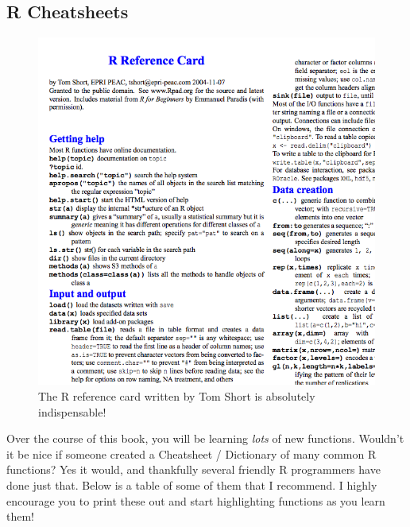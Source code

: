 \documentclass[]{book}
\theoremstyle{definition}
\theoremstyle{definition}
\theoremstyle{remark}
\begin{document}
\subsection{R Cheatsheets}\label{r-cheatsheets}

\begin{figure}

{\centering \includegraphics[width=0.75\linewidth]{images/rreferencess} 

}

\caption{The R reference card written by Tom Short is absolutely indispensable!}\label{fig:rreferencecard}
\end{figure}

Over the course of this book, you will be learning \emph{lots} of new
functions. Wouldn't it be nice if someone created a Cheatsheet /
Dictionary of many common R functions? Yes it would, and thankfully
several friendly R programmers have done just that. Below is a table of
some of them that I recommend. I highly encourage you to print these out
and start highlighting functions as you learn them!
\end{document}
